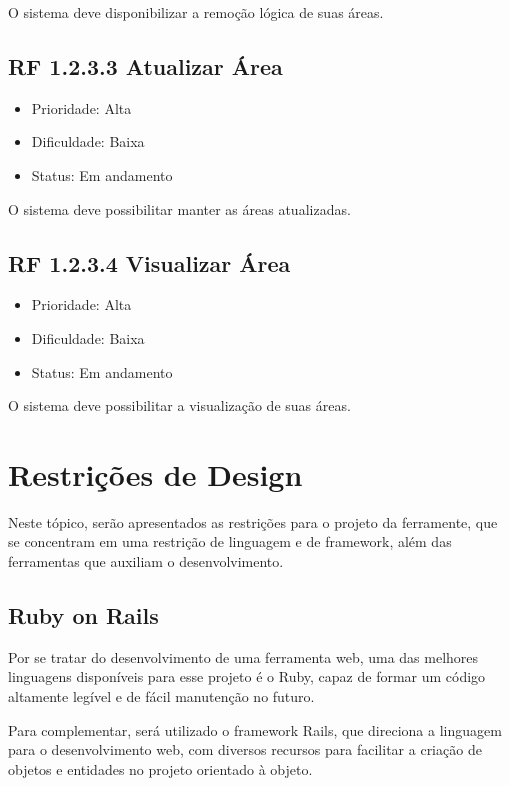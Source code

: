 \begin{apendicesenv}
O sistema deve disponibilizar a remoção lógica de suas áreas.


\subsection{RF 1.2.3.3 Atualizar Área}

\begin{itemize}
  \item{Prioridade: Alta}
  \item{Dificuldade: Baixa}
  \item{Status: Em andamento}
\end{itemize}

O sistema deve possibilitar manter as áreas atualizadas.


\subsection{RF 1.2.3.4 Visualizar Área}

\begin{itemize}
  \item{Prioridade: Alta}
  \item{Dificuldade: Baixa}
  \item{Status: Em andamento}
\end{itemize}

O sistema deve possibilitar a visualização de suas áreas.



\section{Restrições de Design}

Neste tópico, serão apresentados as restrições para o projeto da ferramente, que se concentram em uma restrição de linguagem e de framework, além das ferramentas que auxiliam o desenvolvimento.

\subsection{Ruby on Rails}

Por se tratar do desenvolvimento de uma ferramenta web, uma das melhores linguagens disponíveis para esse projeto é o Ruby, capaz de formar um código altamente legível e de fácil manutenção no futuro.

Para complementar, será utilizado o framework Rails, que direciona a linguagem para o desenvolvimento web, com diversos recursos para facilitar a criação de objetos e entidades no projeto orientado à objeto.


\end{apendicesenv}
